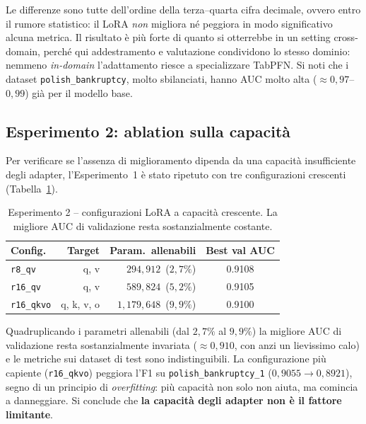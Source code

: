\documentclass[11pt,a4paper]{article}
\begin{document}
Le differenze sono tutte dell'ordine della terza--quarta cifra decimale, ovvero
entro il rumore statistico: il LoRA \emph{non} migliora né peggiora in modo
significativo alcuna metrica. Il risultato è più forte di quanto si otterrebbe
in un setting cross-domain, perché qui addestramento e valutazione condividono
lo stesso dominio: nemmeno \emph{in-domain} l'adattamento riesce a specializzare
TabPFN. Si noti che i dataset \texttt{polish\_bankruptcy}, molto sbilanciati,
hanno AUC molto alta ($\approx 0{,}97$--$0{,}99$) già per il modello base.

\subsection{Esperimento 2: ablation sulla capacità}
\label{sec:capacity}
Per verificare se l'assenza di miglioramento dipenda da una capacità
insufficiente degli adapter, l'Esperimento~1 è stato ripetuto con tre
configurazioni crescenti (Tabella~\ref{tab:capacity}).

\begin{table}[h]
\centering
\caption{Esperimento 2 -- configurazioni LoRA a capacità crescente. La migliore
AUC di validazione resta sostanzialmente costante.}
\label{tab:capacity}
\small
\begin{tabular}{lrrc}
\toprule
Config. & Target & Param.\ allenabili & Best val AUC \\
\midrule
\texttt{r8\_qv}    & q, v       & $294{,}912$\ ($2{,}7\%$)   & 0.9108 \\
\texttt{r16\_qv}   & q, v       & $589{,}824$\ ($5{,}2\%$)   & 0.9105 \\
\texttt{r16\_qkvo} & q, k, v, o & $1{,}179{,}648$\ ($9{,}9\%$) & 0.9100 \\
\bottomrule
\end{tabular}
\end{table}

Quadruplicando i parametri allenabili (dal $2{,}7\%$ al $9{,}9\%$) la migliore
AUC di validazione resta sostanzialmente invariata ($\approx 0{,}910$, con anzi
un lievissimo calo) e le metriche sui dataset di test sono indistinguibili. La
configurazione più capiente (\texttt{r16\_qkvo}) peggiora l'F1 su
\texttt{polish\_bankruptcy\_1} ($0{,}9055 \to 0{,}8921$), segno di un principio di
\emph{overfitting}: più capacità non solo non aiuta, ma comincia a danneggiare.
Si conclude che \textbf{la capacità degli adapter non è il fattore limitante}.
\end{document}

